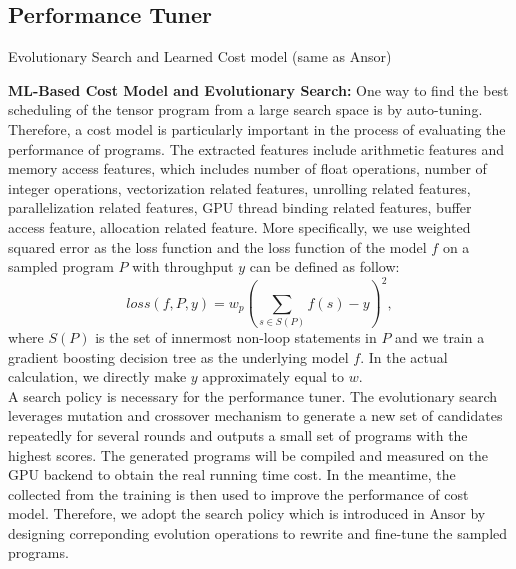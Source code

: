 \subsection{Performance Tuner}

{\color{red} Evolutionary Search and Learned Cost model (same as Ansor)}


\textbf{ML-Based Cost Model and Evolutionary Search:} 
One way to find the best scheduling of the tensor program from a large search space is by auto-tuning. Therefore, a cost model is particularly 
important in the process of evaluating the performance of programs. The extracted features include arithmetic features and memory access features, which
includes number of float operations, number of integer operations, vectorization related features, unrolling related features, parallelization related features,
GPU thread binding related features, buffer access feature, allocation related feature. More specifically, we use weighted squared error as the loss function and 
the loss function of the model $f$ on a sampled program $P$ with throughput $y$ can be defined as follow:
\begin{equation}
    loss(f, P, y) = w_{p}(\sum\limits_{s \in S(P)} f(s) - y)^{2},
\end{equation}
where $S(P)$ is the set of innermost non-loop statements in $P$ and we train a gradient boosting decision tree as the underlying model $f$. In the actual
calculation, we directly make $y$ approximately equal to $w$.\\

A search policy is necessary for the performance tuner. The evolutionary search leverages mutation
and crossover mechanism to generate a new set of candidates repeatedly for several rounds and outputs a small set of programs with the highest scores. The generated
programs will be compiled and measured on the GPU backend to obtain the real running time cost. In the meantime, the collected from the training is then used to
improve the performance of cost model. Therefore, we adopt the search policy which is introduced in Ansor by designing correponding evolution operations to rewrite
and fine-tune the sampled programs.


\label{sec:algo}

